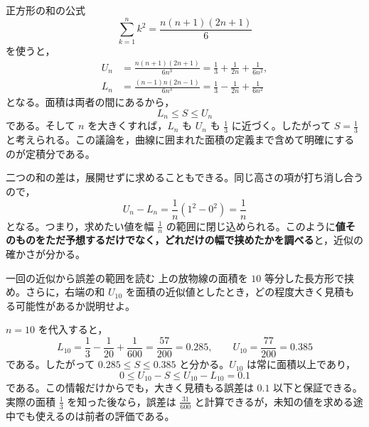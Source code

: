 正方形の和の公式
\[
 \sum_{k=1}^{n}k^2=\frac{n(n+1)(2n+1)}6
\]
を使うと，
\begin{align*}
 U_n&=\frac{n(n+1)(2n+1)}{6n^3}
     =\frac13+\frac{1}{2n}+\frac{1}{6n^2},\\
 L_n&=\frac{(n-1)n(2n-1)}{6n^3}
     =\frac13-\frac{1}{2n}+\frac{1}{6n^2}
\end{align*}
となる。面積は両者の間にあるから，
\[
 L_n\le S\le U_n
\]
である。そして $n$ を大きくすれば，$L_n$ も $U_n$ も $\frac13$ に近づく。したがって $S=\frac13$ と考えられる。この議論を，曲線に囲まれた面積の定義まで含めて明確にするのが定積分である。

二つの和の差は，展開せずに求めることもできる。同じ高さの項が打ち消し合うので，
\[
 U_n-L_n
 =\frac1n\left(1^2-0^2\right)=\frac1n
\]
となる。つまり，求めたい値を幅 $\frac1n$ の範囲に閉じ込められる。このように\textbf{値そのものをただ予想するだけでなく，どれだけの幅で挟めたかを調べる}と，近似の確かさが分かる。

\begin{example}{一回の近似から誤差の範囲を読む}
上の放物線の面積を $10$ 等分した長方形で挟め。さらに，右端の和 $U_{10}$ を面積の近似値としたとき，どの程度大きく見積もる可能性があるか説明せよ。
\end{example}
$n=10$ を代入すると，
\[
 L_{10}=\frac13-\frac1{20}+\frac1{600}
       =\frac{57}{200}=0.285,
 \qquad
 U_{10}=\frac{77}{200}=0.385
\]
である。したがって $0.285\le S\le0.385$ と分かる。$U_{10}$ は常に面積以上であり，
\[
 0\le U_{10}-S\le U_{10}-L_{10}=0.1
\]
である。この情報だけからでも，大きく見積もる誤差は $0.1$ 以下と保証できる。実際の面積 $\frac13$ を知った後なら，誤差は $\frac{31}{600}$ と計算できるが，未知の値を求める途中でも使えるのは前者の評価である。

